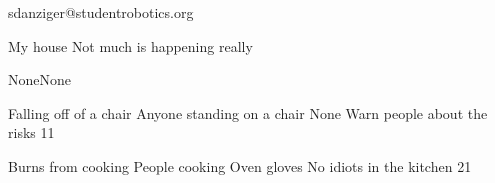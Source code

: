 \documentclass{riskassessment}
\begin{document}
    {sdanziger@studentrobotics.org}



\date{\today}

\maketitle

\activitydetails{\today}
    {My house}
    {Not much is happening really}

\begin{referencelist}
    \item{None}{None}
\end{referencelist}

\begin{risklist}
    \item{Falling off of a chair}
        {Anyone standing on a chair}
        {None}
        {Warn people about the risks}
        {1}{1}

    \item{Burns from cooking}
        {People cooking}
        {Oven gloves}
        {No idiots in the kitchen}
        {2}{1}
\end{risklist}

\review

\newpage

\risktable
\end{document}
